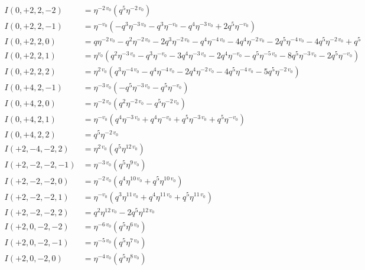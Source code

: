 \documentclass{article}
\begin{document}
\begin{align*}
I(0, +2, 2, -2) &= \eta^{-2 \, v_{0}} \left( q^{5} \eta^{-2 \, v_{0}} \right) \\
I(0, +2, 2, -1) &= \eta^{-v_{0}} \left( -q^{3} \eta^{-3 \, v_{0}} - q^{3} \eta^{-v_{0}} - q^{4} \eta^{-3 \, v_{0}} + 2 q^{5} \eta^{-v_{0}} \right) \\
I(0, +2, 2, 0) &= q \eta^{-2 \, v_{0}} - q^{2} \eta^{-2 \, v_{0}} - 2 q^{3} \eta^{-2 \, v_{0}} - q^{4} \eta^{-4 \, v_{0}} - 4 q^{4} \eta^{-2 \, v_{0}} - 2 q^{5} \eta^{-4 \, v_{0}} - 4 q^{5} \eta^{-2 \, v_{0}} + q^{5} \\
I(0, +2, 2, 1) &= \eta^{v_{0}} \left( q^{2} \eta^{-3 \, v_{0}} - q^{3} \eta^{-v_{0}} - 3 q^{4} \eta^{-3 \, v_{0}} - 2 q^{4} \eta^{-v_{0}} - q^{5} \eta^{-5 \, v_{0}} - 8 q^{5} \eta^{-3 \, v_{0}} - 2 q^{5} \eta^{-v_{0}} \right) \\
I(0, +2, 2, 2) &= \eta^{2 \, v_{0}} \left( q^{3} \eta^{-4 \, v_{0}} - q^{4} \eta^{-4 \, v_{0}} - 2 q^{4} \eta^{-2 \, v_{0}} - 4 q^{5} \eta^{-4 \, v_{0}} - 5 q^{5} \eta^{-2 \, v_{0}} \right) \\
I(0, +4, 2, -1) &= \eta^{-3 \, v_{0}} \left( -q^{5} \eta^{-3 \, v_{0}} - q^{5} \eta^{-v_{0}} \right) \\
I(0, +4, 2, 0) &= \eta^{-2 \, v_{0}} \left( q^{2} \eta^{-2 \, v_{0}} - q^{5} \eta^{-2 \, v_{0}} \right) \\
I(0, +4, 2, 1) &= \eta^{-v_{0}} \left( q^{4} \eta^{-3 \, v_{0}} + q^{4} \eta^{-v_{0}} + q^{5} \eta^{-3 \, v_{0}} + q^{5} \eta^{-v_{0}} \right) \\
I(0, +4, 2, 2) &= q^{5} \eta^{-2 \, v_{0}} \\
I(+2, -4, -2, 2) &= \eta^{2 \, v_{0}} \left( q^{5} \eta^{12 \, v_{0}} \right) \\
I(+2, -2, -2, -1) &= \eta^{-3 \, v_{0}} \left( q^{5} \eta^{9 \, v_{0}} \right) \\
I(+2, -2, -2, 0) &= \eta^{-2 \, v_{0}} \left( q^{4} \eta^{10 \, v_{0}} + q^{5} \eta^{10 \, v_{0}} \right) \\
I(+2, -2, -2, 1) &= \eta^{-v_{0}} \left( q^{3} \eta^{11 \, v_{0}} + q^{4} \eta^{11 \, v_{0}} + q^{5} \eta^{11 \, v_{0}} \right) \\
I(+2, -2, -2, 2) &= q^{2} \eta^{12 \, v_{0}} - 2 q^{5} \eta^{12 \, v_{0}} \\
I(+2, 0, -2, -2) &= \eta^{-6 \, v_{0}} \left( q^{5} \eta^{6 \, v_{0}} \right) \\
I(+2, 0, -2, -1) &= \eta^{-5 \, v_{0}} \left( q^{5} \eta^{7 \, v_{0}} \right) \\
I(+2, 0, -2, 0) &= \eta^{-4 \, v_{0}} \left( q^{5} \eta^{8 \, v_{0}} \right) \\

\end{align*}
\end{document}
